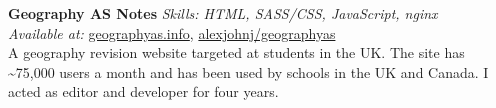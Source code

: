 \textbf{Geography AS Notes}  \newline
\textit{Skills: HTML, SASS/CSS, JavaScript, nginx}\\
\textit{Available at:} \href{https://geographyas.info}{geographyas.info}, \href{https://github.com/\myweb/geographyas}{alexjohnj/geographyas} \\
A geography revision website targeted at students in the UK. The site has
\textasciitilde{}75,000 users a month and has been used by schools in the UK and
Canada. I acted as editor and developer for four years.

